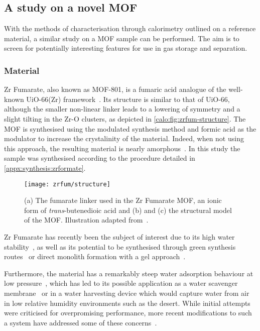 
\subsection{A study on a novel MOF}

With the methods of characterisation through calorimetry
outlined on a reference material, a similar study on a 
MOF sample can be performed. The aim is to screen for 
potentially interesting features for use in gas 
storage and separation.

\subsubsection{Material}

Zr Fumarate, also known as MOF-801, is a fumaric 
acid analogue of the well-known UiO-66(Zr) 
framework~\cite{wissmannModulatedSynthesisZrfumarate2012}.
Its structure is similar to that of UiO-66, although 
the smaller non-linear linker leads to a lowering of 
symmetry and a slight tilting in the Zr-O clusters,
as depicted in \autoref{calo:fig:zrfum-structure}.
The MOF is synthesised using the modulated synthesis method and 
formic acid as the modulator to increase the crystalinity of the
material. Indeed, when not using this approach, the resulting
material is nearly amorphous~\cite{zahnInsightMechanismModulated2014}.
In this study the sample was synthesised according to the procedure 
detailed in \autoref{appx:synthesis:zrformate}.

\begin{figure}[htb]
    \centering
    \texttt{[image: zrfum/structure]}%
    \caption{(a) The fumarate linker used in the Zr Fumarate
    MOF, an ionic form of \textit{trans}-butenedioic acid and
    (b) and (c) the structural model of the MOF. Illustration
    adapted from~\citet{wissmannModulatedSynthesisZrfumarate2012}.}%
    \label{calo:fig:zrfum-structure}
\end{figure}

Zr Fumarate has recently been the subject of interest due to its
high water stability~\cite{zahnWaterbornZrbasedPorous2015}, 
as well as its potential to be synthesised through green synthesis
routes~\cite{reinschFacileGreenRoute2016} or direct
monolith formation with a gel approach~\cite{buekenGelbasedMorphologicalDesign2017}.

Furthermore, the material has a remarkably steep water adsorption
behaviour at low pressure~\cite{furukawaWaterAdsorptionPorous2014},
which has led to its possible application as a water scavenger 
membrane~\cite{baeTransparentMetalOrganic2016} or in a water 
harvesting device which would capture water from air in low relative
humidity environments such as the desert. While initial 
attempts~\cite{kimWaterHarvestingAir2017} were criticised for
overpromising performance, more recent modifications to such 
a system have addressed some of these 
concerns~\cite{kimAdsorptionbasedAtmosphericWater2018}.

